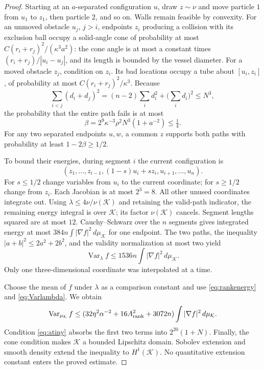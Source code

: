 \documentclass[11pt]{article}
\numberwithin{equation}{section}
\theoremstyle{definition}
\theoremstyle{remark}\newtheorem{remark}[theorem]{Remark}
\newcommand{\Var}{\operatorname{Var}}
\newcommand{\K}{\mathcal K}
\newcommand{\dd}{\,d}
\begin{document}
\begin{proof}
Starting at an $a$-separated configuration $u$, draw $z\sim\nu$ and move
particle $1$ from $u_1$ to $z_1$, then particle $2$, and so on. Walls remain
feasible by convexity. For an unmoved obstacle $u_j$, $j>i$, endpoints
$z_i$ producing a collision with its exclusion ball occupy a solid-angle
cone of probability at most
$C(r_i+r_j)^2/(\kappa^3a^2)$: the cone angle is at most a constant times
$(r_i+r_j)/|u_i-u_j|$, and its length is bounded by the vessel diameter.
For a moved obstacle $z_j$, condition on $z_i$. Its bad locations occupy
a tube about $[u_i,z_i]$, of probability at most
$C(r_i+r_j)^2/\kappa^3$.
Because
\[
 \sum_{i<j}(d_i+d_j)^2
 =(n-2)\sum_i d_i^2+\Big(\sum_i d_i\Big)^2\le N^3,
\]
the probability that the entire path fails is at most
\begin{equation}\label{eq:badpath}
 \beta=2^9\kappa^{-3}\rho^2N^3(1+a^{-2})\le\tfrac14.
\end{equation}
For any two separated endpoints $u,w$, a common $z$ supports both paths
with probability at least $1-2\beta\ge1/2$.

To bound their energies, during segment $i$ the current configuration is
\[
 (z_1,\ldots,z_{i-1},(1-s)u_i+sz_i,u_{i+1},\ldots,u_n).
\]
For $s\le1/2$ change variables from $u_i$ to the current coordinate; for
$s\ge1/2$ change from $z_i$. Each Jacobian is at most $2^3=8$.
All other unused coordinates integrate out. Using
$\lambda\le4\nu/\nu(\K)$ and retaining the valid-path indicator, the
remaining energy integral is over $\K$; its factor $\nu(\K)$ cancels.
Segment lengths squared are at most $12$. Cauchy--Schwarz over the $n$
segments gives integrated energy at most $384n\int|\nabla f|^2\dd\mu_\K$
for one endpoint. The two paths, the inequality $|a+b|^2\le2a^2+2b^2$,
and the validity normalization at most two yield
\begin{equation}\label{eq:Varlambda}
 \Var_\lambda f\le1536n\int|\nabla f|^2\dd\mu_\K.
\end{equation}
Only one three-dimensional coordinate was interpolated at a time.

Choose the mean of $f$ under $\lambda$ as a comparison constant and use
\eqref{eq:rankenergy} and \eqref{eq:Varlambda}. We obtain
\[
 \Var_{\mu_\K}f\le
 (32\eta^2\alpha^{-2}+16A_{\rm rank}^2+3072n)
                         \int|\nabla f|^2\dd\mu_\K.
\]
Condition \eqref{eq:atiny} absorbs the first two terms into
$2^{20}(1+N)$. Finally, the cone condition makes $\K$ a bounded Lipschitz
domain. Sobolev extension and smooth density extend the inequality to
$H^1(\K)$. No quantitative extension constant enters the proved estimate.
\end{proof}
\end{document}
